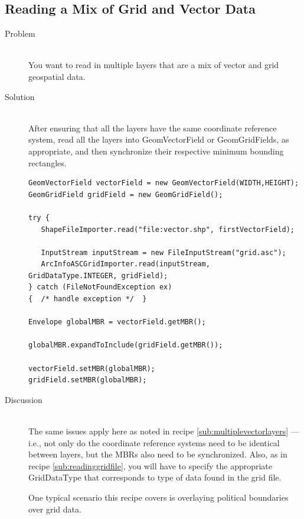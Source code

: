 \documentclass[twoside,10pt]{book}
\newcommand\class[1]{\index{Classes!{#1}}\textsf{#1}}
\begin{document}

\subsection{Reading a Mix of Grid and Vector Data}
\label{sub:readingmixofdata}

\begin{description}
\item[Problem]~\\
You want to read in multiple layers that are a mix of vector and grid geospatial data.

\item[Solution]~\\
After ensuring that all the layers have the same coordinate reference system, read all the layers into GeomVectorField or GeomGridFields, as appropriate, and then synchronize their respective minimum bounding rectangles.
\begin{Verbatim}[frame=lines,framesep=5mm,commandchars=+\[\]]
GeomVectorField vectorField = new GeomVectorField(WIDTH,HEIGHT);
GeomGridField gridField = new GeomGridField();

try {
   ShapeFileImporter.read("file:vector.shp", firstVectorField);

   InputStream inputStream = new FileInputStream("grid.asc");
   ArcInfoASCGridImporter.read(inputStream, GridDataType.INTEGER, gridField);
} catch (FileNotFoundException ex)
{  /* handle exception */  }

Envelope globalMBR = vectorField.getMBR();

globalMBR.expandToInclude(gridField.getMBR());

vectorField.setMBR(globalMBR);
gridField.setMBR(globalMBR);
\end{Verbatim}

\item[Discussion ]~\\
The same issues apply here as noted in recipe
\ref{sub:multiplevectorlayers} --- i.e., not only do the coordinate
reference systems need to be identical between layers, but the MBRs
also need to be synchronized.  Also, as in recipe
\ref{sub:readinggridfile}, you will have to specify the appropriate
\class{GridDataType} that corresponds to type of data found in the
grid file.

One typical scenario this recipe covers is overlaying political
boundaries over grid data.
\end{description}
\end{document}
